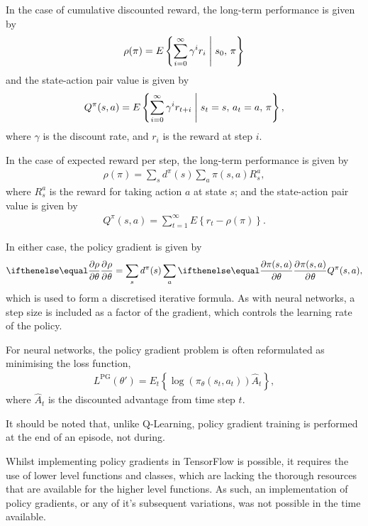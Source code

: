 In the case of cumulative discounted reward, the long-term performance is given
by
\begin{align*}
    \rho(\pi) = E\left\{
        \sum_{i=0}^{\infty} \gamma^{i}r_{i}
        \;\middle|\; s_0,\, \pi
    \right\}
\end{align*}
and the state-action pair value is given by
\begin{align*}
    Q^\pi(s,a) = E\left\{
        \sum_{i=0}^{\infty} \gamma^{i}r_{t+i}
        \;\middle|\; s_t=s,\, a_t=a,\, \pi
    \right\},
\end{align*}
where $\gamma$ is the discount rate, and $r_i$ is the reward at step $i$.

In the case of expected reward per step, the long-term performance is given by
\begin{align*}
    \rho(\pi) = \sum_s d^\pi(s) \sum_a \pi(s,a) R_s^a,
\end{align*}
where $R_s^a$ is the reward for taking action $a$ at state $s$;
and the state-action pair value is given by
\begin{align*}
    Q^\pi(s,a) = \sum_{t=1}^{\infty} E\left\{
        r_t - \rho(\pi)
    \right\}.
\end{align*}

In either case, the policy gradient is given by
\begin{align*}
    \Rpdiff{\rho}{\theta} =
    \sum_s d^\pi(s)
    \sum_a \Rpdiff{\pi(s,a)}{\theta}
    Q^\pi(s,a),
\end{align*}
which is used to form a discretised iterative formula.
As with neural networks, a step size is included as a factor of the
gradient, which controls the learning rate of the policy.

For neural networks, the policy gradient problem is often reformulated as
minimising the loss function,
\begin{align*}
    L^\text{PG}(\theta') = E_t\left\{
        \log(\pi_\theta(s_t,a_t))\hat{A}_t
    \right\},
\end{align*}
where $\hat{A}_t$ is the discounted advantage from time step $t$.

It should be noted that, unlike Q-Learning, policy gradient training is
performed at the end of an episode, not during.

Whilst implementing policy gradients in TensorFlow is possible, it requires the
use of lower level functions and classes, which are lacking the thorough
resources that are available for the higher level functions.
As such, an implementation of policy gradients, or any of it's subsequent
variations, was not possible in the time available.



